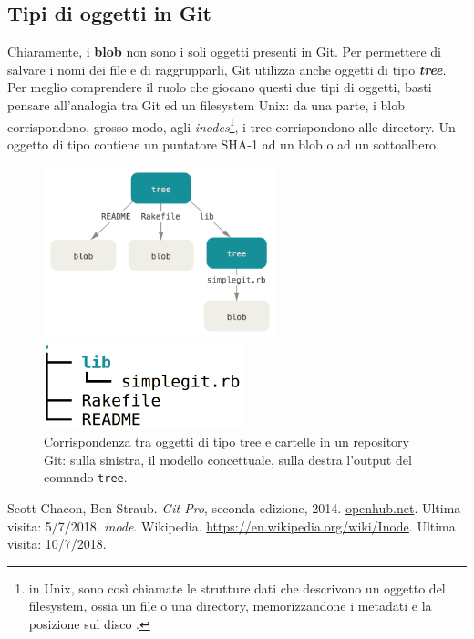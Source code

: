 \documentclass[12pt]{article}
\def\code#1{\texttt{#1}}
\begin{document}
\subsection{Tipi di oggetti in Git}
Chiaramente, i \textbf{blob} non sono i soli oggetti presenti in Git.
Per permettere di salvare i nomi dei file e di raggrupparli, Git utilizza anche oggetti di tipo \textit{\textbf{tree}}. 
Per meglio comprendere il ruolo che giocano questi due tipi di oggetti, basti pensare all'analogia tra Git ed un filesystem Unix: da una parte, i blob corrispondono, grosso modo, agli \textit{inodes}\footnote{in Unix, sono così chiamate le strutture dati che descrivono un oggetto del filesystem, ossia un file o una directory, memorizzandone i metadati e la posizione sul disco \cite{winode}.}, i tree corrispondono alle directory. 
Un oggetto di tipo contiene un puntatore SHA-1 ad un blob o ad un sottoalbero.
\begin{figure}[h]
	\centering
	\begin{minipage}{7cm}
		\includegraphics[height=5cm]{data-model-graph.png}
	\end{minipage}
	\qquad
	\begin{minipage}{7cm}
		\includegraphics[height=2.5cm]{data-model-tree.png}
	\end{minipage}
	\caption{Corrispondenza tra oggetti di tipo tree e cartelle in un repository Git: sulla sinistra, il modello concettuale, sulla destra l'output del comando \code{tree}.}
\end{figure}
\newpage
\begin{thebibliography}{9}
	Scott Chacon, Ben Straub. \textit{Git Pro}, seconda edizione, 2014.
	\url{openhub.net}. Ultima visita: 5/7/2018.
	\textit{inode}. Wikipedia. \url{https://en.wikipedia.org/wiki/Inode}. Ultima visita: 10/7/2018.
\end{thebibliography}
\end{document}
